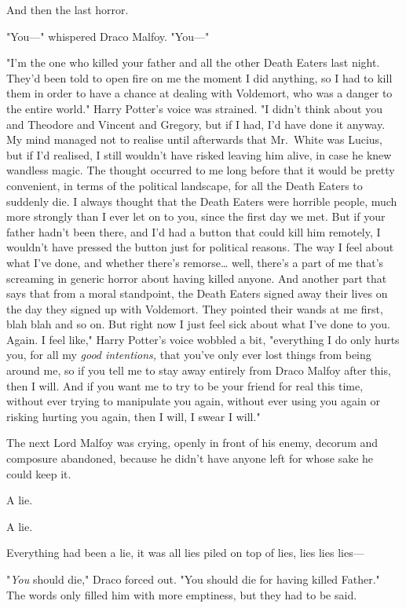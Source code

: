 And then the last horror.

"You---" whispered Draco Malfoy. "You---"

"I'm the one who killed your father and all the other Death Eaters last night.
They'd been told to open fire on me the moment I did anything, so I had to kill
them in order to have a chance at dealing with Voldemort, who was a danger to
the entire world." Harry Potter's voice was strained. "I didn't think about you
and Theodore and Vincent and Gregory, but if I had, I'd have done it anyway. My
mind managed not to realise until afterwards that Mr.~White was Lucius, but if
I'd realised, I still wouldn't have risked leaving him alive, in case he knew
wandless magic. The thought occurred to me long before that it would be pretty
convenient, in terms of the political landscape, for all the Death Eaters to
suddenly die. I always thought that the Death Eaters were horrible people, much
more strongly than I ever let on to you, since the first day we met. But if
your father hadn't been there, and I'd had a button that could kill him
remotely, I wouldn't have pressed the button just for political reasons. The
way I feel about what I've done, and whether there's remorse{\ldots} well,
there's a part of me that's screaming in generic horror about having killed
anyone. And another part that says that from a moral standpoint, the Death
Eaters signed away their lives on the day they signed up with Voldemort. They
pointed their wands at me first, blah blah and so on. But right now I just feel
sick about what I've done to you. Again. I feel like," Harry Potter's voice
wobbled a bit, "everything I do only hurts you, for all my \emph{good
intentions,} that you've only ever lost things from being around me, so if you
tell me to stay away entirely from Draco Malfoy after this, then I will. And if
you want me to try to be your friend for real this time, without ever trying to
manipulate you again, without ever using you again or risking hurting you
again, then I will, I swear I will."

The next Lord Malfoy was crying, openly in front of his enemy, decorum and
composure abandoned, because he didn't have anyone left for whose sake he could
keep it.

A lie.

A lie.

Everything had been a lie, it was all lies piled on top of lies, lies lies
lies---

"\emph{You} should die," Draco forced out. "You should die for having killed
Father." The words only filled him with more emptiness, but they had to be said.

